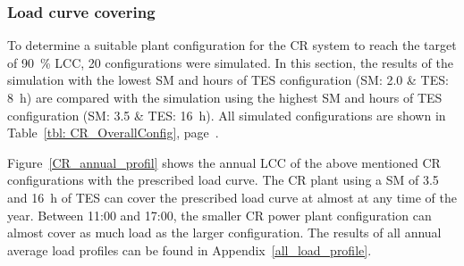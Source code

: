 \subsubsection{Load curve covering}

To determine a suitable plant configuration for the \ac{CR} system to reach the target of \SI{90}{\percent} \acf{LCC}, 20 configurations were simulated. In this section, the results of the simulation with the lowest \ac{SM} and hours of \ac{TES} configuration (\ac{SM}: 2.0 \& \ac{TES}: \SI{8}{h}) are compared with the simulation using the highest \ac{SM} and hours of \ac{TES} configuration (SM: 3.5 \& TES: \SI{16}{h}). All simulated configurations are shown in Table~\ref{tbl: CR_OverallConfig}, page~\pageref{tbl: CR_OverallConfig}.


Figure~\ref{CR_annual_profil} shows the annual \ac{LCC} of the above mentioned \ac{CR} configurations with the prescribed load curve. The \ac{CR} plant using a \ac{SM} of 3.5 and \SI{16}{h} of \ac{TES} can cover the prescribed load curve at almost at any time of the year. Between 11:00 and 17:00, the smaller \ac{CR} power plant configuration can almost cover as much load as the larger configuration. The results of all annual average load profiles can be found in Appendix~\ref{all_load_profile}.

